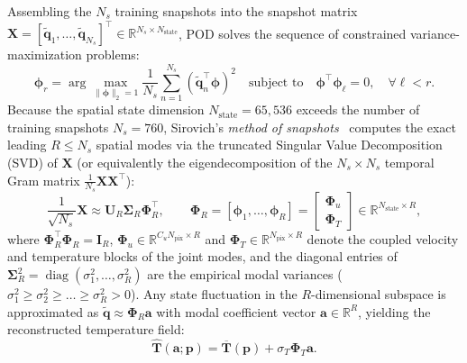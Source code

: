 Assembling the $N_s$ training snapshots into the snapshot matrix $\mathbf{X} = [\tilde{\mathbf{q}}_1, \dots, \tilde{\mathbf{q}}_{N_s}]^\top \in \mathbb{R}^{N_s \times N_{\text{state}}}$, POD solves the sequence of constrained variance-maximization problems:
\begin{equation}
    \boldsymbol{\phi}_r = \arg\max_{\|\boldsymbol{\phi}\|_2 = 1} \frac{1}{N_s} \sum_{n=1}^{N_s} \left(\tilde{\mathbf{q}}_n^\top \boldsymbol{\phi}\right)^2 \quad \text{subject to} \quad \boldsymbol{\phi}^\top \boldsymbol{\phi}_\ell = 0, \quad \forall \ell < r.
    \label{eq:bg_pod_variational}
\end{equation}
Because the spatial state dimension $N_{\text{state}} = 65{,}536$ exceeds the number of training snapshots $N_s = 760$, Sirovich's \emph{method of snapshots}~\cite{sirovich1987turbulence} computes the exact leading $R \le N_s$ spatial modes via the truncated Singular Value Decomposition (SVD) of $\mathbf{X}$ (or equivalently the eigendecomposition of the $N_s \times N_s$ temporal Gram matrix $\frac{1}{N_s}\mathbf{X}\mathbf{X}^\top$):
\begin{equation}
    \frac{1}{\sqrt{N_s}} \mathbf{X} \approx \mathbf{U}_R \boldsymbol{\Sigma}_R \boldsymbol{\Phi}_R^\top, \qquad \boldsymbol{\Phi}_R = [\boldsymbol{\phi}_1, \dots, \boldsymbol{\phi}_R] = \begin{bmatrix} \boldsymbol{\Phi}_u \\ \boldsymbol{\Phi}_T \end{bmatrix} \in \mathbb{R}^{N_{\text{state}} \times R},
    \label{eq:bg_snapshot_svd}
\end{equation}
where $\boldsymbol{\Phi}_R^\top \boldsymbol{\Phi}_R = \mathbf{I}_R$, $\boldsymbol{\Phi}_u \in \mathbb{R}^{C_u N_{\text{pix}} \times R}$ and $\boldsymbol{\Phi}_T \in \mathbb{R}^{N_{\text{pix}} \times R}$ denote the coupled velocity and temperature blocks of the joint modes, and the diagonal entries of $\boldsymbol{\Sigma}_R^2 = \operatorname{diag}(\sigma_1^2, \dots, \sigma_R^2)$ are the empirical modal variances ($\sigma_1^2 \ge \sigma_2^2 \ge \dots \ge \sigma_R^2 > 0$). Any state fluctuation in the $R$-dimensional subspace is approximated as $\tilde{\mathbf{q}} \approx \boldsymbol{\Phi}_R \mathbf{a}$ with modal coefficient vector $\mathbf{a} \in \mathbb{R}^R$, yielding the reconstructed temperature field:
\begin{equation}
    \hat{\mathbf{T}}(\mathbf{a}; \mathbf{p}) = \overline{\mathbf{T}}(\mathbf{p}) + \sigma_T \boldsymbol{\Phi}_T \mathbf{a}.
    \label{eq:bg_pod_temp_recon}
\end{equation}


